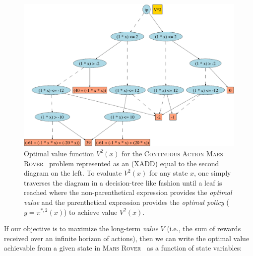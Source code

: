 \documentclass[twoside,11pt]{article}
\newcommand{\MarsRover}{\textsc{Mars Rover }}
\begin{document}
\begin{figure}[t!]
\begin{minipage}[b]{0.48\linewidth}
\end{minipage}
\begin{minipage}[b]{0.48\linewidth}
\includegraphics[width=1\textwidth]{Figures2/diagrams/roverdot.pdf}
\vspace{6mm}

\caption{\footnotesize Optimal value function $V^2(x)$ for the
\textsc{Continuous Action}  \MarsRover\ problem represented as an (XADD) equal to the second diagram on the left. 
To evaluate
$V^2(x)$ for any state $x$, one simply traverses the diagram in a
decision-tree like fashion until a leaf is reached where the
non-parenthetical expression provides the \emph{optimal value} and the
parenthetical expression provides the \emph{optimal policy} 
($y = \pi^{*,2}(x)$) to achieve value $V^2(x)$.}
\label{fig:opt_val_pol}
\vspace{-5mm}
\end{minipage}
\end{figure}
If our objective is to maximize the long-term \emph{value} $V$ (i.e.,
the sum of rewards received over an infinite horizon of actions), then
we can write the optimal value achievable from a given state in \MarsRover\ 
as a function of state variables:
\end{document}
